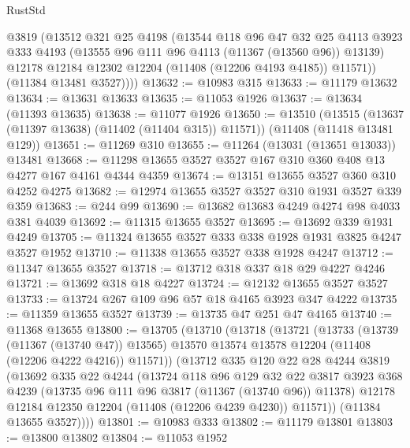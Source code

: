 \begin{lexlean}{RustStd}
\begin{coremodule}
          @3819
          (@13512
            @321
            @25
            @4198
            (@13544
              @118
              @96
              @47
              @32
              @25
              @4113
              @3923
              @333
              @4193
              (@13555 @96 @111 @96 @4113 (@11367 (@13560 @96)) @13139)
              @12178
              @12184
              @12302
              @12204
              (@11408 (@12206 @4193 @4185))
              @11571))
          (@11384 @13481 @3527))))
@13632 := @10983 @315
@13633 := @11179 @13632
@13634 := @13631 @13633
@13635 := @11053 @1926
@13637 := @13634 (@11393 @13635)
@13638 := @11077 @1926
@13650 := @13510
    (@13515 (@13637 (@11397 @13638) (@11402 (@11404 @315)) @11571))
    (@11408 (@11418 @13481 @129))
@13651 := @11269 @310
@13655 := @11264 (@13031 (@13651 @13033)) @13481
@13668 := @11298 @13655 @3527 @3527 @167 @310 @360 @408 @13 @4277 @167 @4161 @4344 @4359
@13674 := @13151 @13655 @3527 @360 @310 @4252 @4275
@13682 := @12974 @13655 @3527 @3527 @310 @1931 @3527 @339 @359
@13683 := @244 @99
@13690 := @13682 @13683 @4249 @4274 @98 @4033 @381 @4039
@13692 := @11315 @13655 @3527
@13695 := @13692 @339 @1931 @4249
@13705 := @11324 @13655 @3527 @333 @338 @1928 @1931 @3825 @4247 @3527 @1952
@13710 := @11338 @13655 @3527 @338 @1928 @4247
@13712 := @11347 @13655 @3527
@13718 := @13712 @318 @337 @18 @29 @4227 @4246
@13721 := @13692 @318 @18 @4227
@13724 := @12132 @13655 @3527 @3527
@13733 := @13724 @267 @109 @96 @57 @18 @4165 @3923 @347 @4222
@13735 := @11359 @13655 @3527
@13739 := @13735 @47 @251 @47 @4165
@13740 := @11368 @13655
@13800 := @13705
    (@13710
      (@13718
        (@13721
          (@13733
            (@13739 (@11367 (@13740 @47)) @13565)
            @13570
            @13574
            @13578
            @12204
            (@11408 (@12206 @4222 @4216))
            @11571))
        (@13712
          @335
          @120
          @22
          @28
          @4244
          @3819
          (@13692
            @335
            @22
            @4244
            (@13724
              @118
              @96
              @129
              @32
              @22
              @3817
              @3923
              @368
              @4239
              (@13735 @96 @111 @96 @3817 (@11367 (@13740 @96)) @11378)
              @12178
              @12184
              @12350
              @12204
              (@11408 (@12206 @4239 @4230))
              @11571))
          (@11384 @13655 @3527))))
@13801 := @10983 @333
@13802 := @11179 @13801
@13803 := @13800 @13802
@13804 := @11053 @1952

\end{coremodule}
\end{lexlean}
